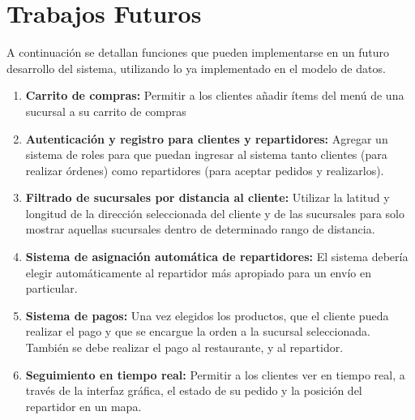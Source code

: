 
\section{Trabajos Futuros}

A continuación se detallan funciones que pueden implementarse en un futuro desarrollo del sistema, utilizando lo ya implementado en el modelo de datos.

\begin{enumerate}
    \item \textbf{Carrito de compras:} Permitir a los clientes añadir ítems del menú de una sucursal a su carrito de compras
    \item \textbf{Autenticación y registro para clientes y repartidores:} Agregar un sistema de roles para que puedan ingresar al sistema tanto clientes (para realizar órdenes) como repartidores (para aceptar pedidos y realizarlos). 
    \item \textbf{Filtrado de sucursales por distancia al cliente:} Utilizar la latitud y longitud de la dirección seleccionada del cliente y de las sucursales para solo mostrar aquellas sucursales dentro de determinado rango de distancia.
    \item \textbf{Sistema de asignación automática de repartidores:} El sistema debería elegir automáticamente al repartidor más apropiado para un envío en particular.
    \item \textbf{Sistema de pagos:} Una vez elegidos los productos, que el cliente pueda realizar el pago y que se encargue la orden a la sucursal seleccionada. También se debe realizar el pago al restaurante, y al repartidor.
    \item \textbf{Seguimiento en tiempo real:} Permitir a los clientes ver en tiempo real, a través de la interfaz gráfica, el estado de su pedido y la posición del repartidor en un mapa.
\end{enumerate}

